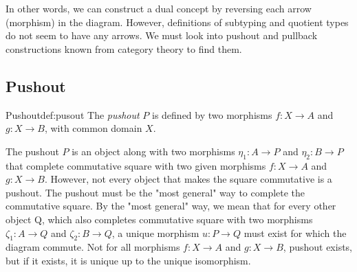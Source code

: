 In other words, we can construct a dual concept by reversing each arrow (morphism) in the diagram. However, definitions of subtyping and quotient types
do not seem to have any arrows. We must look into pushout and pullback constructions known from category theory \cite{CategoryTheory} to find them.
\subsection{Pushout}
\begin{defi}{Pushout}{def:pusout}
The \emph{pushout} \cite{CategoryTheory} $P$ is defined by two morphisms $f: X \rightarrow A$ and $g: X \rightarrow B$, with common domain $X$.
\begin{center}
\end{center}
The pushout $P$ is an object along with two morphisms $\eta_1: A \rightarrow P$ and $\eta_2: B \rightarrow P$ that complete commutative square with two given morphisms $f: X \rightarrow A$  \pagebreak
and $g: X \rightarrow B$. However, not every object that makes the square commutative is a pushout. The pushout must be the "most general" way to complete the 
commutative square. By the "most general" way, we mean that for every other object Q, which also completes commutative square with two morphisms $\zeta_1: A \rightarrow Q$ and $\zeta_2: B \rightarrow Q$, a unique morphism $u: P \rightarrow Q$ must exist for which the diagram commute. Not for all morphisms $f: X \rightarrow A$ and $g: X \rightarrow B$, pushout exists, but if it exists, it is unique up to the unique isomorphism.
\end{defi}
